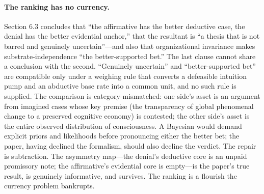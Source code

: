 \documentclass[11pt]{article}
\begin{document}
\paragraph{The ranking has no currency.} Section 6.3 concludes that ``the affirmative has the better deductive case, the denial has the better evidential anchor,'' that the resultant is ``a thesis that is not barred and genuinely uncertain''---and also that organizational invariance makes substrate-independence ``the better-supported bet.'' The last clause cannot share a conclusion with the second. ``Genuinely uncertain'' and ``better-supported bet'' are compatible only under a weighing rule that converts a defeasible intuition pump and an abductive base rate into a common unit, and no such rule is supplied. The comparison is category-mismatched: one side's asset is an argument from imagined cases whose key premise (the transparency of global phenomenal change to a preserved cognitive economy) is contested; the other side's asset is the entire observed distribution of consciousness. A Bayesian would demand explicit priors and likelihoods before pronouncing either the better bet; the paper, having declined the formalism, should also decline the verdict. The repair is subtraction. The asymmetry map---the denial's deductive core is an unpaid promissory note; the affirmative's evidential core is empty---is the paper's true result, is genuinely informative, and survives. The ranking is a flourish the currency problem bankrupts.
\end{document}
